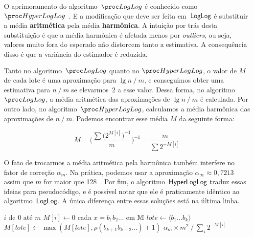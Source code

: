 O aprimoramento do algoritmo~$\LOG$ é conhecido como $\HLOG$~\citep{hyperloglog:07}. E a modificação que deve ser feita 
em~$\textsf{LogLog}$ é substituir a média \textbf{aritmética} pela média \textbf{harmônica}. A intuição por trás desta 
substituição é que a média harmônica é afetada menos por \textit{outliers}, ou seja, valores muito fora do esperado não 
distorcem tanto a estimativa. A consequência disso é que a variância do estimador é reduzida. 

Tanto no algoritmo~$\LOG$ quanto no $\HLOG$, o valor de $M$ de cada lote é uma aproximação para $\lg n \mathbin{/} m$, e 
conseguimos obter uma estimativa para $n \mathbin{/} m$ se elevarmos~$2$ a esse valor. Dessa forma, no algoritmo~$\LOG$, 
a média aritmética das aproximações de $\lg n \mathbin{/} m$ é calculada. Por outro lado, no algoritmo~$\HLOG$, 
calculamos a média harmônica das aproximações de $n \mathbin{/} m$. Podemos encontrar esse média $\overline{M}$ da 
seguinte forma:

\[ \overline{M} = \bigg(\frac{\sum\big(2^{M[i]}\big)^{-1}}{m}\bigg)^{-1} = \frac{m}{\sum2^{-M[i]}} \]

O fato de trocarmos a média aritmética pela harmônica também interfere no fator de correção $\alpha_m$. Na prática, 
podemos usar a aproximação $\alpha_{\infty} \approx 0{,}7213$ assim que $m$ for maior que 128~\citep{HyperLogLogWiki}.
Por fim, o algoritmo~$\textsf{HyperLogLog}$ traduz essas ideias para pseudocódigo, e é possível notar que ele é praticamente 
idêntico ao algoritmo~$\textsf{LogLog}$. A única diferença entre essas soluções está na última linha.

\begin{codebox}
      \li \For $i$ de $0$ até $m$
            \Do
      \li   $M[i] \gets 0$
            \End
      \li \For cada $x = b_1b_2{\dots}$ em $\mathbb{M}$ 
            \Do
      \li   $lote \gets \langle b_1 {\dots} b_k \rangle$
      \li   $M[lote] \gets \max(M[lote], \rho(b_{k+1}b_{k+2}{\dots}) + 1)$
            \End
      \li
      \Return $\alpha_m \times m^2 \mathbin{/} \sum_i{2^{-M[i]}}$   
      \End
\end{codebox}